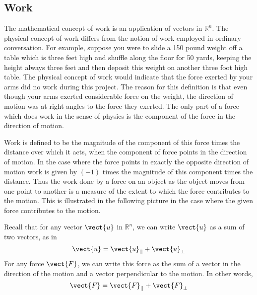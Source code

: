 \subsection{Work}

The mathematical concept of work is an application of vectors in $\mathbb{R}^n$.  The physical concept
of work differs from the notion of work employed in
ordinary conversation. For example, suppose you were to slide a 150 pound weight
off a table which is three feet high and shuffle along the floor for 50
yards, keeping the height always three feet and then
deposit this weight on another three foot high table. The physical concept
of work would indicate that the force exerted by your arms did no work
during this project. The reason for this definition is that even
though your arms exerted considerable force on the weight, the direction of motion was at right angles to the force they
exerted. The only part of a force which does work in the sense of physics is
the component of the force in the direction of motion.

Work is defined to be the magnitude of the component of
this force times the distance over which it acts, when the 
component of force points in the direction of motion. In the case where the force points in exactly the opposite direction of motion
work is given by $\left( -1\right) $
times the magnitude of this component times the distance.
Thus the work done by a force on an object as
the object moves from one point to another is a measure of the extent to
which the force contributes to the motion. This is illustrated in the
following picture in the case where the given force contributes to the
motion.

\begin{center}
\end{center}

Recall that for any vector $\vect{u}$ in $\mathbb{R}^n$, we can write $\vect{u}$ as a sum
of two vectors, as in
\begin{equation*}
\vect{u} = \vect{u}_{||} + \vect{u}_{\perp}
\end{equation*}
For any force $\vect{F}$,  
we can write this force as the sum of a vector in the direction of the motion and a vector
perpendicular to the motion. In other words,
\begin{equation*}
\vect{F} = \vect{F}_{||} + \vect{F}_{\bot}
\end{equation*}

